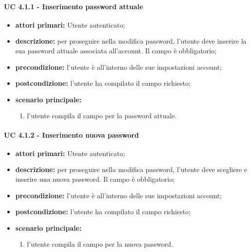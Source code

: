 				\paragraph{UC 4.1.1 - Inserimento password attuale}
				\begin{itemize}
					\item \textbf{attori primari:} Utente autenticato;
					\item \textbf{descrizione:} per proseguire nella modifica password, l'utente deve inserire la sua password attuale associata all'account. Il campo è obbligatorio;
					\item \textbf{precondizione:} l'utente è all'interno delle sue impostazioni account;
					\item \textbf{postcondizione:} l'utente ha compilato il campo richiesto;
					\item \textbf{scenario principale:}
					\begin{enumerate}
						\item l'utente compila il campo per la password attuale.
					\end{enumerate}
				\end{itemize}

				\paragraph{UC 4.1.2 - Inserimento nuova password}
				\begin{itemize}
					\item \textbf{attori primari:} Utente autenticato;
					\item \textbf{descrizione:} per proseguire nella modifica password, l'utente deve scegliere e inserire una nuova password. Il campo è obbligatorio;
					\item \textbf{precondizione:} l'utente è all'interno delle sue impostazioni account;
					\item \textbf{postcondizione:} l'utente ha compilato il campo richiesto;
					\item \textbf{scenario principale:}
					\begin{enumerate}
						\item l'utente compila il campo per la nuova password.
					\end{enumerate}
				\end{itemize}

